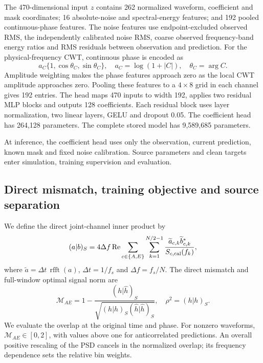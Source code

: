\documentclass[10pt,prd,aps,a4paper,twocolumn,superscriptaddress,nofootinbib,floatfix]{revtex4-2}
\begin{document}
The 470-dimensional input $z$ contains 262 normalized waveform, coefficient and mask coordinates; 16 absolute-noise and spectral-energy features; and 192 pooled continuous-phase features. The noise features use endpoint-excluded observed RMS, the independently calibrated noise RMS, coarse observed frequency-band energy ratios and RMS residuals between observation and prediction. For the physical-frequency CWT, continuous phase is encoded as
\begin{equation}
a_C\{1,\cos\theta_C,\sin\theta_C\},\quad
a_C=\log(1+|C|),\quad\theta_C=\arg C.\label{eq:continuous_phase}
\end{equation}
Amplitude weighting makes the phase features approach zero as the local CWT amplitude approaches zero. Pooling these features to a $4\times8$ grid in each channel gives 192 entries. The head maps 470 inputs to width 192, applies two residual MLP blocks and outputs 128 coefficients. Each residual block uses layer normalization, two linear layers, GELU and dropout 0.05. The coefficient head has 264,128 parameters. The complete stored model has 9,589,685 parameters.

At inference, the coefficient head uses only the observation, current prediction, known mask and fixed noise calibration. Source parameters and clean targets enter simulation, training supervision and evaluation.

\subsection{Direct mismatch, training objective and source separation}\label{loss}
We define the direct joint-channel inner product by
\begin{equation}
(a|b)_S=4\Delta f\operatorname{Re}
\sum_{c\in\{A,E\}}\sum_{k=1}^{N/2-1}
\frac{\widetilde a_{c,k}\widetilde b_{c,k}^{*}}{S_{c,\rm cal}(f_k)},\label{eq:joint_inner}
\end{equation}
where $\widetilde a=\Delta t\,\operatorname{rfft}(a)$, $\Delta t=1/f_s$ and $\Delta f=f_s/N$. The direct mismatch and full-window optimal signal norm are
\begin{equation}
\mathcal M_{AE}=1-\frac{(h|\widehat h)_S}{\sqrt{(h|h)_S(\widehat h|\widehat h)_S}},\quad
\rho^2=(h|h)_S.\label{eq:joint_mismatch}
\end{equation}
We evaluate the overlap at the original time and phase. For nonzero waveforms, $\mathcal M_{AE}\in[0,2]$, with values above one for anticorrelated predictions. An overall positive rescaling of the PSD cancels in the normalized overlap; its frequency dependence sets the relative bin weights.
\end{document}
